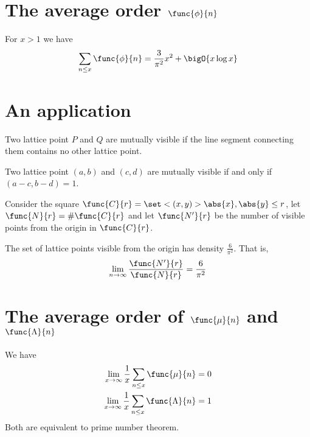 \section{The average order \(\func{\phi}{n}\)}
\begin{theorem}
    For \(x > 1\) we have 
    \begin{equation*}
        \sum_{n \leq x} \func{\phi}{n} = \dfrac{3}{\pi^2} x^2 + \bigO{x \log x}
    \end{equation*}
\end{theorem}

\section{An application}
\begin{definition}
    Two lattice point \(P\) and \(Q\) are mutually visible if the line segment connecting  them contains no other lattice point.
\end{definition}
\begin{theorem}
    Two lattice point \((a,b)\) and \((c,d)\) are mutually visible if and only if \((a -c , b -d)  = 1\).
\end{theorem}

Consider the square \(\func{C}{r} = \set<(x,y)>{\abs{x},\abs{y} \leq r}\), let \(\func{N}{r} = \#\func{C}{r}\) and let \(\func{N'}{r}\) be the number of visible points from the origin in \(\func{C}{r}\). 
\begin{theorem}
    The set of lattice points visible from the origin has density \(\frac{6}{\pi^2}\). That is,
    \begin{align*}
        \lim_{n \to \infty} \dfrac{\func{N'}{r}}{\func{N}{r}} = \dfrac{6}{\pi^2}
    \end{align*}
\end{theorem}

\section{The average order of \(\func{\mu}{n}\) and \(\func{\Lambda}{n}\)}
\begin{theorem}
    We have 
    \begin{align*}
        \lim_{x \to \infty} \dfrac{1}{x} \sum_{n \leq x} \func{\mu}{n} &= 0\\
        \lim_{x \to \infty} \dfrac{1}{x} \sum_{n \leq x} \func{\Lambda}{n} &= 1\\
    \end{align*}
    Both are equivalent to prime number theorem.
\end{theorem}
